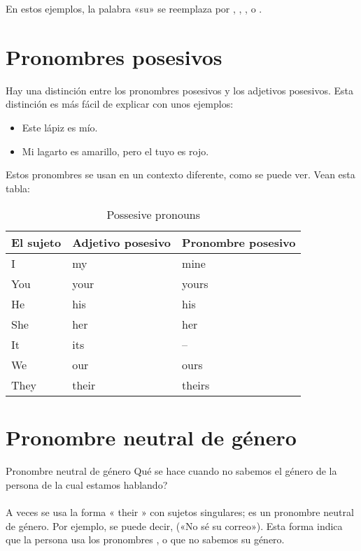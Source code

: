 En estos ejemplos, la palabra «su» se reemplaza
por , , , o .

\section{Pronombres posesivos}

Hay una distinci\'on entre los pronombres posesivos y los adjetivos posesivos.
Esta distinci\'on es m\'as f\'acil de explicar con unos ejemplos:

\begin{itemize}
	\item Este l\'apiz es m\'io.
		\arr {}
	\item Mi lagarto es amarillo, pero el tuyo es rojo.
		\arr {}
\end{itemize}

Estos pronombres se usan en un contexto diferente, como se puede ver.
Vean esta tabla:

\begin{table}[H]
	\centering
	\begin{tabular}{lll}
	\toprule
	\textbf{El sujeto} & \textbf{Adjetivo posesivo} & \textbf{Pronombre posesivo} \\
	\midrule
	I & my & mine \\
	You & your & yours \\
	He & his & his \\
	She & her & her \\
	It & its & -- \\
	We & our & ours\\
	They & their & theirs \\
	\bottomrule
	\end{tabular}
	\caption{Possesive pronouns}
\end{table}


\section{Pronombre neutral de g\'enero}
\begin{conf}{Pronombre neutral de g\'enero}
\textquestiondown Qu\'e se hace cuando no sabemos el g\'enero de la persona de
la cual estamos hablando? \\
\\
A veces se usa la forma « their » con sujetos singulares; es un pronombre neutral
de g\'enero.
Por ejemplo, se puede decir,  («No sé su correo»).
Esta forma indica que la persona usa los pronombres , o que
no sabemos su g\'enero.
\end{conf}

